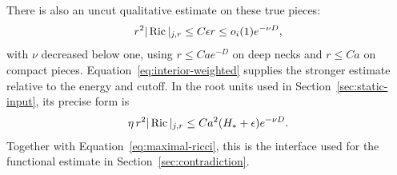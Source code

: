 There is also an uncut qualitative estimate on these true pieces:
\begin{equation}
 r^2|\operatorname{Ric}|_{j,r}\le C\epsilon r
       \le o_i(1)e^{-\nu D},
 \label{para:uncut-weight}
\end{equation}
with $\nu$ decreased below one, using $r\le Ca e^{-D}$ on deep
necks and $r\le Ca$ on compact pieces.
Equation~\eqref{eq:interior-weighted} supplies the stronger estimate
relative to the energy and cutoff.  In the root units used in
Section~\ref{sec:static-input}, its precise form is
\[
 \eta\,r^2|\operatorname{Ric}|_{j,r}
       \le Ca^2(H_*+\epsilon)e^{-\nu D}.
\]
Together with Equation~\eqref{eq:maximal-ricci}, this is the interface
used for the functional estimate in Section~\ref{sec:contradiction}.
